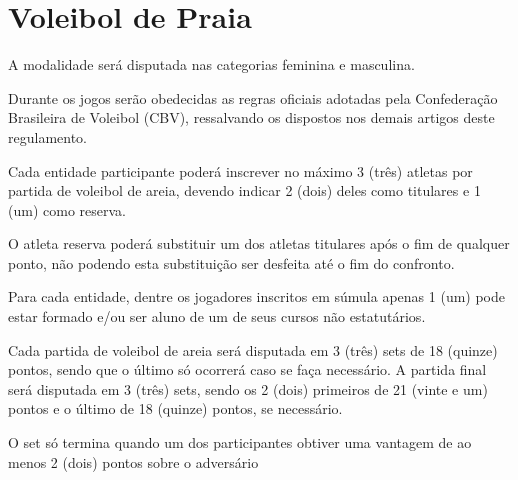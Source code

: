 {\let\clearpage\relax \chapter{Voleibol de Praia}}

\begin{article}
	A modalidade será disputada nas categorias feminina e masculina.
\end{article}

\begin{article}
	Durante os jogos serão obedecidas as regras oficiais adotadas pela Confederação Brasileira de Voleibol (CBV), ressalvando os dispostos nos demais artigos deste regulamento.
\end{article}

\begin{article}
	Cada entidade participante poderá inscrever no máximo 3 (três) atletas por partida de voleibol de areia, devendo indicar 2 (dois) deles como titulares e 1 (um) como reserva.

	\begin{xparagraph}
		O atleta reserva poderá substituir um dos atletas titulares após o fim de qualquer ponto, não podendo esta substituição ser desfeita até o fim do confronto.
	\end{xparagraph}

	\begin{xparagraph}
	    Para cada entidade, dentre os jogadores inscritos em súmula apenas 1 (um) pode estar formado e/ou ser aluno de um de seus cursos não estatutários.
	\end{xparagraph}
\end{article}

\begin{article}
	Cada partida de voleibol de areia será disputada em 3 (três) sets de 18 (quinze) pontos, sendo que o último só ocorrerá caso se faça necessário. A partida final será disputada em 3 (três) sets, sendo os 2 (dois) primeiros de 21 (vinte e um) pontos e o último de 18 (quinze) pontos, se necessário.

	\begin{xparagraph}
		O set só termina quando um dos participantes obtiver uma vantagem de ao menos 2 (dois) pontos sobre o adversário
	\end{xparagraph}
\end{article}
